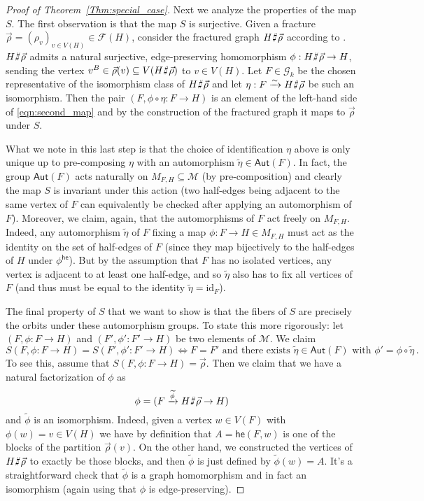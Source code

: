 \documentclass[authorcolumns,numberwithinsect]{no-lipics-v2022}
\def\fracture#1#2{\ensuremath{#1\raisebox{.2ex}{\rotatebox[origin=c]{-15}{$\sharp$}}#2}}
\def\fracture#1#2{\ensuremath{#1\raisebox{.2ex}{\rotatebox[origin=c]{-15}{$\sharp$}}#2}}
\newcommand{\he}{\mathsf{he}}
\begin{document}
\begin{proof}[Proof of Theorem~\ref{Thm:special_case}]
Next we analyze the properties of the map $S$. The first observation is that the map $S$ is surjective. Given a fracture $\vec\rho = (\rho_v)_{v \in V(H)} \in \mathcal{F}(H)$, consider the fractured graph $\fracture{H}{\vec\rho}$ according to .
$\fracture{H}{\vec\rho}$ admits a natural surjective, edge-preserving homomorphism $\phi: \fracture{H}{\vec\rho} \to H$, sending the vertex $v^B \in \vec\rho(v) \subseteq V(\fracture{H}{\vec\rho})$ to $v \in V(H)$. 
Let $F \in \mathcal{G}_k$ be the chosen representative of the isomorphism class of $\fracture{H}{\vec\rho}$ and let $\eta : F \xrightarrow{\sim} \fracture{H}{\vec\rho}$ be such an isomorphism. Then the pair $(F, \phi \circ \eta:  F \to H)$ is an element of the left-hand side of \eqref{eqn:second_map} and by the construction of the fractured graph it maps to $\vec\rho$ under $S$.

What we note in this last step is that the choice of identification $\eta$ above is only unique up to pre-composing $\eta$ with an automorphism $\widetilde \eta \in \mathsf{Aut}(F)$. In fact, the group $\mathsf{Aut}(F)$ acts naturally on $M_{F,H} \subseteq \mathcal{M}$ (by pre-composition) and clearly the map $S$ is invariant under this action (two half-edges being adjacent to the same vertex of $F$ can equivalently be checked after applying an automorphism of $F$). 
Moreover, we claim, again, that the automorphisms of $F$ act freely on $M_{F,H}$. Indeed, any automorphism $\widetilde \eta$ of $F$ fixing a map $\phi: F \to H \in M_{F,H}$ must act as the identity on the set of half-edges of $F$ (since they map bijectively to the half-edges of $H$ under $\phi^\he$). But by the assumption that $F$ has no isolated vertices, any vertex is adjacent to at least one half-edge, and so $\widetilde \eta$ also has to fix all vertices of $F$ (and thus must be equal to the identity $\widetilde \eta = \mathrm{id}_F$).

The final property of $S$ that we want to show is that the fibers of $S$ are precisely the orbits under these automorphism groups.
To state this more rigorously: let $(F, \phi: F \to H)$ and $(F', \phi': F' \to H)$ be two elements of $\mathcal{M}$. We claim
\begin{equation}  \label{eqn:S_equivalence_claim}
    S(F, \phi: F \to H) = S(F', \phi': F' \to H) \iff F = F' \text{ and there exists $\widetilde \eta \in \mathsf{Aut}(F)$ with }\phi' = \phi \circ \widetilde \eta\,.
\end{equation}
To see this, assume that $S(F, \phi: F \to H) = \vec\rho$. Then we claim that we have a natural factorization of $\phi$ as
\[
\phi = (F \xrightarrow{\widetilde \phi} \fracture{H}{\vec\rho} \to H)
\]
and $\widetilde \phi$ is an isomorphism. Indeed, given a vertex $w \in V(F)$ with $\phi(w)=v \in V(H)$ we have by definition that $A=\he(F,w)$ is one of the blocks of the partition $\vec\rho(v)$. On the other hand, we constructed the vertices of $\fracture{H}{\vec\rho}$ to exactly be those blocks, and then $\widetilde \phi$ is just defined by $\widetilde \phi(w)=A$. It's a straightforward check that $\widetilde \phi$ is a graph homomorphism and in fact an isomorphism (again using that $\phi$ is edge-preserving).


\end{proof}
\end{document}
